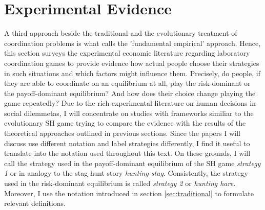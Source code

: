\documentclass[11pt]{article}
\begin{document}
\section{Experimental Evidence}
\label{sec:experimentalevidence}
A third approach beside the traditional and the evolutionary treatment of 
coordination problems is what \textcite{camerer_behavioral_2003} calls the 
'fundamental empirical' approach.
Hence, this section surveys the experimental economic literature regarding 
laboratory coordination games to provide evidence how actual people choose
their strategies in such situations and which factors might influence them. 
Precisely, do people, if they are able to coordinate on an equilibrium at all,
play the risk-dominant or the payoff-dominant equilibrium? And how does their
choice change playing the game repeatedly?
Due to the rich experimental literature on human decisions in social 
dilemmetas, I will concentrate on studies with frameworks similiar to the 
evolutionary SH game trying to compare the evidence with the results of the 
theoretical approaches outlined in previous sections. 
Since the papers I will discuss use different notation and 
label strategies differently, I find it useful to translate into the
notation used throughout this text. On these grounds, I will call the 
strategy used in the payoff-dominant equilibrium of the SH game
\textit{strategy 1} or in analogy to the stag hunt story \textit{hunting stag}.
Consistently, the strategy used in the risk-dominant equilibrium is called
\textit{strategy 2} or \textit{hunting hare}. Moreover, I use the notation
introduced in section \ref{sec:traditional} to formulate relevant definitions.
\end{document}
